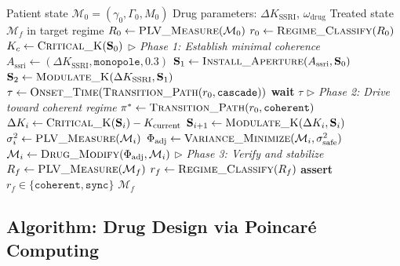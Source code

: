 \documentclass[10pt,twocolumn]{article}
\theoremstyle{remark}
\newcommand{\Scoord}{\mathbf{S}}
\newcommand{\Gstate}{\Gamma}
\newcommand{\Mstate}{\mathcal{M}}
\begin{document}
\begin{algorithm}[t]
\caption{Antidepressant Treatment Protocol in pNPL}
\label{alg:antidepressant}
\begin{algorithmic}[1]
\Require Patient state $\Mstate_0 = (\gamma_0, \Gstate_0, M_0)$
\Require Drug parameters: $\Delta K_{\mathrm{SSRI}}$, $\omega_{\mathrm{drug}}$
\Ensure Treated state $\Mstate_f$ in target regime
\State $R_0 \gets \textsc{PLV\_Measure}(\Mstate_0)$
\State $r_0 \gets \textsc{Regime\_Classify}(R_0)$
\State $K_c \gets \textsc{Critical\_K}(\Scoord_0)$
    \State $\triangleright$ \textit{Phase 1: Establish minimal coherence}
    \State $A_{\mathrm{ssri}} \gets (\Delta K_{\mathrm{SSRI}}, \texttt{monopole}, 0.3)$
    \State $\Scoord_1 \gets \textsc{Install\_Aperture}(A_{\mathrm{ssri}}, \Scoord_0)$
    \State $\Scoord_2 \gets \textsc{Modulate\_K}(\Delta K_{\mathrm{SSRI}}, \Scoord_1)$
    \State $\tau \gets \textsc{Onset\_Time}(\textsc{Transition\_Path}(r_0, \texttt{cascade}))$
    \State \textbf{wait} $\tau$ 
\EndIf
\State $\triangleright$ \textit{Phase 2: Drive toward coherent regime}
\State $\pi^* \gets \textsc{Transition\_Path}(r_0, \texttt{coherent})$
    \State $\Delta K_i \gets \textsc{Critical\_K}(\Scoord_i) - K_{\mathrm{current}}$
    \State $\Scoord_{i+1} \gets \textsc{Modulate\_K}(\Delta K_i, \Scoord_i)$
    \State $\sigma^2_i \gets \textsc{PLV\_Measure}(\Mstate_i)$
        \State $\Phi_{\mathrm{adj}} \gets \textsc{Variance\_Minimize}(\Mstate_i, \sigma^2_{\mathrm{safe}})$
        \State $\Mstate_i \gets \textsc{Drug\_Modify}(\Phi_{\mathrm{adj}}, \Mstate_i)$
    \EndIf
\EndFor
\State $\triangleright$ \textit{Phase 3: Verify and stabilize}
\State $R_f \gets \textsc{PLV\_Measure}(\Mstate_f)$
\State $r_f \gets \textsc{Regime\_Classify}(R_f)$
\State \textbf{assert} $r_f \in \{\texttt{coherent}, \texttt{sync}\}$
\State \Return $\Mstate_f$
\end{algorithmic}
\end{algorithm}

\subsection{Algorithm: Drug Design via Poincar\'{e} Computing}
\end{document}
